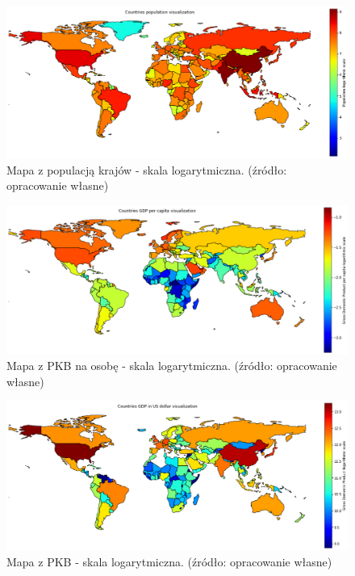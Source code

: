 \documentclass[11pt]{report}
\begin{document}
    \begin{figure}[!htp]
        \centering
        \includegraphics[width=1 \textwidth]{fig/CLUST/population_log.png}
        \caption{Mapa z populacją krajów - skala logarytmiczna. (źródło: opracowanie własne)}
        \label{fig:clustPop_log}
    \end{figure}

    \begin{figure}[!htp]
        \centering
        \includegraphics[width=1 \textwidth]{fig/CLUST/gdp_log.png}
        \caption{Mapa z PKB na osobę - skala logarytmiczna. (źródło: opracowanie własne)}
        \label{fig:clustGDP_log}
    \end{figure}

    \begin{figure}[!htp]
        \centering
        \includegraphics[width=1 \textwidth]{fig/CLUST/gdp2015.png}
        \caption{Mapa z PKB - skala logarytmiczna. (źródło: opracowanie własne)}
        \label{fig:clustGDP2015_log}
    \end{figure}
\end{document}
